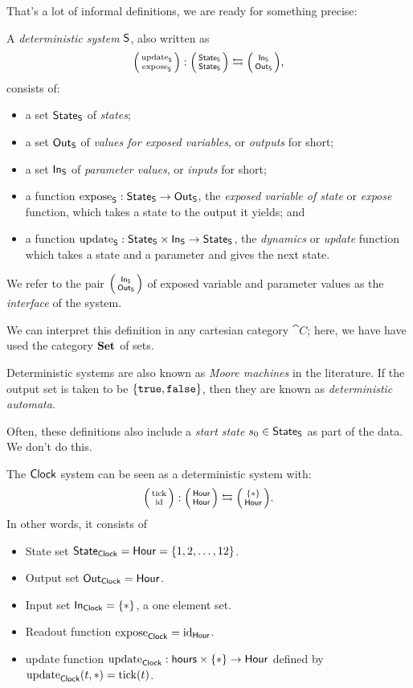 \documentclass[DynamicalBook]{subfiles}
\begin{document}
That's a lot of informal definitions, we are ready for something precise:
\begin{definition}\label{def.deterministic_system}
  A \emph{deterministic system} $\mathsf{S}$, also written as 
  $$\lens{\update{S}}{\expose{S}} : \lens{\State{S}}{\State{S}} \leftrightarrows \lens{\In{S}}{\Out{S}},$$ 
  consists of:
  \begin{itemize}
    \item a set $\mathsf{State}_{\mathsf{S}}$ of \emph{states};
    \item a set $\mathsf{Out}_{\mathsf{S}}$ of \emph{values for exposed variables}, or \emph{outputs}
      for short;
    \item a set $\mathsf{In}_{\mathsf{S}}$ of \emph{parameter values}, or \emph{inputs} for short;
    \item a function $\mathrm{expose}_{\mathsf{S}} : \mathsf{State}_{\mathsf{S}} \to \mathsf{Out}_{\mathsf{S}}$, the \emph{exposed variable of state} or
      \emph{expose} function, which takes a state to the output it yields; and
    \item a function $\mathrm{update}_{\mathsf{S}} : \mathsf{State}_{\mathsf{S}} \times \mathsf{In}_{\mathsf{S}} \to \mathsf{State}_{\mathsf{S}}$, the \emph{dynamics} or
      \emph{update} function which takes a state and a parameter and gives the
      next state.
  \end{itemize}
  We refer to the pair $\lens{\In{S}}{\Out{S}}$ of exposed variable and parameter values as
  the \emph{interface} of the system.

We can interpret this definition in any cartesian category $\cat{C}$; here, we
have have used the category $\textbf{Set}$ of sets.
\end{definition}

\begin{remark}
  Deterministic systems are also known as \emph{Moore machines} in the
  literature. If the output set is taken to be $\{\mathtt{true},
  \mathtt{false}\}$, then they are known as \emph{deterministic automata}.

  Often, these definitions also include a \emph{start state} $s_0 \in \mathsf{State}_{\mathsf{S}}$
  as part of the data. We don't do this.
\end{remark}

\begin{example}\label{ex.clock_system}
  The $\mathsf{Clock}$ system can be seen as a deterministic system with:
  $$\lens{\fun{tick}}{\id} : \lens{\Set{Hour}}{\Set{Hour}} \fromto \lens{\{\ast\}}{\Set{Hour}}.$$
  In other words, it consists of
  \begin{itemize}
  \item State set $\mathsf{State}_{\mathsf{Clock}} = \mathsf{Hour} =\{1,2,\ldots,12\}$.
  \item Output set $\mathsf{Out}_{\mathsf{Clock}} = \mathsf{Hour}$.
  \item Input set $\In{Clock} = \{\ast\}$, a one element set.
  \item Readout function $\mathrm{expose}_{\mathsf{Clock}} = \mathrm{id}_{\mathsf{Hour}}$.
  \item update function $\mathrm{update}_{\mathsf{Clock}} : \mathsf{hours} \times \{\ast\} \to \mathsf{Hour}$
    defined by $\mathrm{update}_{\mathsf{Clock}}(t, \ast) = \mathrm{tick}(t)$.
  \end{itemize}
\end{example}
\end{document}
